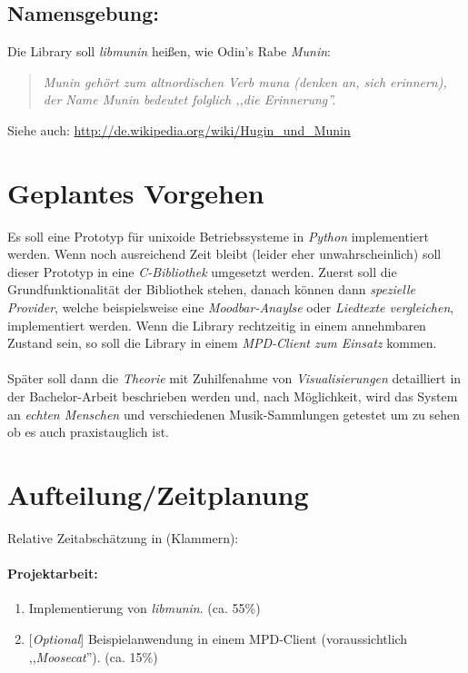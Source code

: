 \documentclass[8pt,a4paper,ngerman]{scrartcl}
\begin{document}
    \subsection{Namensgebung:}

        Die Library soll \emph{libmunin} heißen, wie Odin's Rabe \emph{Munin}:

        \begin{quote}
            \textit{Munin gehört zum altnordischen Verb muna (denken an, sich erinnern), 
            der Name Munin bedeutet folglich ,,die Erinnerung''.}
        \end{quote}

        Siehe auch: \url{http://de.wikipedia.org/wiki/Hugin_und_Munin}

\section{Geplantes Vorgehen}
    Es soll eine Prototyp für unixoide Betriebssysteme in \emph{Python}
    implementiert werden. Wenn noch
    ausreichend Zeit bleibt (leider eher unwahrscheinlich) soll dieser Prototyp in eine
    \emph{C-Bibliothek} umgesetzt werden. Zuerst soll die Grundfunktionalität der
    Bibliothek stehen, danach können dann \emph{spezielle Provider}, welche
    beispielsweise eine \emph{Moodbar-Anaylse} oder \emph{Liedtexte vergleichen}, implementiert
    werden. Wenn die Library rechtzeitig in einem annehmbaren Zustand sein, so soll
    die Library in einem \emph{MPD-Client zum Einsatz} kommen. 
    \\
    \\
    Später soll dann die \emph{Theorie} mit Zuhilfenahme von \emph{Visualisierungen} detailliert in 
    der Bachelor-Arbeit beschrieben werden und, nach Möglichkeit, wird das System an 
    \emph{echten Menschen} und verschiedenen Musik-Sammlungen getestet um zu
    sehen ob es auch praxistauglich ist.

\section{Aufteilung/Zeitplanung}
    Relative Zeitabschätzung in (Klammern):

    \paragraph{Projektarbeit:}
        \begin{enumerate} 
            \item Implementierung von \emph{libmunin}. (ca. 55\%)
            \item {[}\emph{Optional}{]} Beispielanwendung in einem MPD-Client (voraussichtlich
                ,,\emph{Moosecat}''). (ca. 15\%)
        \end{enumerate}
\end{document}

